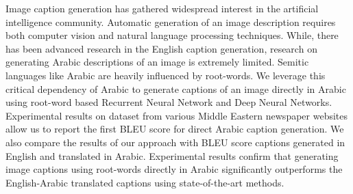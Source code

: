 Image caption generation has gathered widespread interest in the artificial intelligence community. Automatic generation of an image description requires both computer vision and natural language processing techniques.  While, there has been advanced research in the English caption generation,  research on generating Arabic descriptions of an image is extremely limited.  Semitic languages like Arabic are heavily influenced by root-words.  We leverage this critical dependency of Arabic to generate captions of an image directly in Arabic using  root-word based Recurrent Neural Network and Deep Neural Networks.  Experimental results on dataset from various Middle Eastern newspaper websites allow us to report the first BLEU score for direct Arabic caption generation. We also compare the results of our approach with BLEU score captions generated in English and translated in Arabic. Experimental results confirm that generating image captions using root-words directly in Arabic significantly outperforms the English-Arabic translated captions using state-of-the-art methods.
